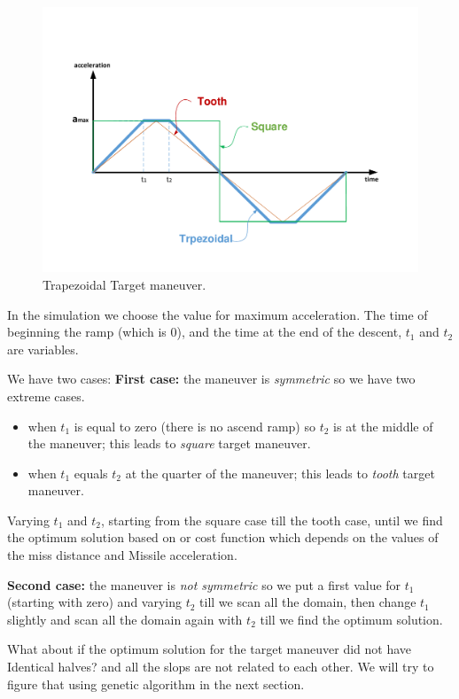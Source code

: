 \begin{figure}[htb]
	\centering
	\includegraphics[scale = 0.65]{fig/toothSquareTrapezoidal.pdf}
	\caption{Trapezoidal Target maneuver.}
	\label{trapezoidalacc}
\end{figure}
In the simulation we choose the value for maximum acceleration. The time of beginning the ramp (which is 0), and the time at the end of the descent, $t_1$ and $t_2$ are variables. 

We have two cases: \textbf{First case:} the maneuver is \textit{symmetric} so we have two extreme cases.
\begin{itemize}
	\item when $t_1$ is equal to zero (there is no ascend ramp)  so $t_2$ is at the middle of the maneuver; this leads to \textit{square} target maneuver.
	\item when $t_1$ equals $t_2$ at the quarter of the maneuver; this leads to \textit{tooth} target maneuver.  
\end{itemize}
Varying $t_1$ and $t_2$, starting from the square case till the tooth case, until we find the optimum solution based on or cost function which depends on the values of the miss distance and Missile acceleration. 


\textbf{Second case:} the maneuver is \textit{not symmetric} so we put a first value for $t_1$ (starting with zero) and varying $t_2$ till we scan all the domain, then change $t_1$ slightly and scan all the domain again with $t_2$ till we find the optimum solution.

What about if the optimum solution for the target maneuver did not have Identical halves? and all the slops are not related to each other. We will try to figure that using genetic algorithm in the next section. 

